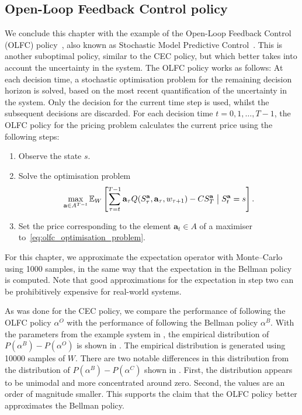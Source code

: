\documentclass[main.tex]{subfiles}
\begin{document}
\subsection{Open-Loop Feedback Control policy}
We conclude this chapter with the example of the Open-Loop
Feedback Control (OLFC) policy~\citep[Ch.~6]{bertsekas2005dynamic},
also known as Stochastic Model
Predictive Control~\citep{farmer2017uncertainty}. This is another suboptimal policy,
similar to the CEC policy, but which better takes into account the uncertainty in the system.
The OLFC policy works as follows: At each decision time, a stochastic
optimisation problem for the remaining decision horizon is
solved, based on the most recent quantification of the uncertainty in the
system. Only the decision for the current time step is used, whilst
the subsequent decisions are discarded.
For each decision time $t=0,1,\dots,T-1$, the OLFC policy for the
pricing problem calculates the current price using the following steps:
\begin{enumerate}
\item Observe the state $s$.
\item Solve the optimisation problem
  \begin{equation}\label{eq:olfc_optimisation_problem}
    \max_{\mathbf a\in A^{T-t}}\mathbb E_W\left[
      \sum_{\tau=t}^{T-1}\mathbf a_\tau Q(S_\tau^{\mathbf a},\mathbf
      a_\tau,w_{\tau+1})-CS_T^{\mathbf a} \bigm\vert S_t^{\mathbf a}=s \right].
  \end{equation}
\item Set the price corresponding to the element
  $\mathbf{a}_t\in A$ of a maximiser to~\eqref{eq:olfc_optimisation_problem}.
\end{enumerate}
For this chapter, we approximate the expectation operator with
Monte--Carlo using \num{1000} samples, in the same way that the expectation
in the Bellman policy is computed.
Note that good approximations for the expectation in step two can be
prohibitively expensive for real-world systems.

As was done for the CEC policy, we compare the performance of following the
OLFC policy $\alpha^O$ with the performance of following the Bellman
policy $\alpha^B$. With the parameters from the example system in
,
the empirical distribution of $P(\alpha^B)-P(\alpha^O)$ is shown in
. The empirical distribution is generated
using \num{10000} samples of $W$.
There are two notable differences in this distribution from the
distribution of $P(\alpha^B)-P(\alpha^C)$ shown in .
First, the distribution appears to be unimodal and more concentrated around zero. Second,
the values are an order of magnitude smaller.
This supports the claim that the OLFC policy better approximates the
Bellman policy.
\end{document}
